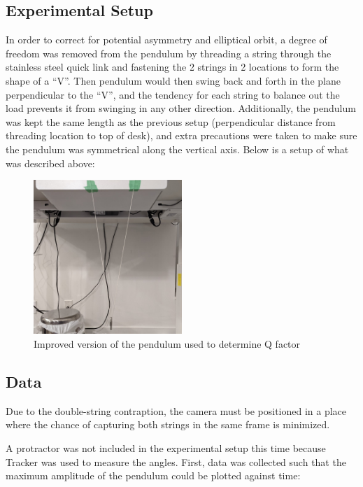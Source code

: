 \documentclass[12pt]{article}
\begin{document}
\subsection{Experimental Setup}
In order to correct for potential asymmetry and elliptical orbit, a degree of freedom was removed from the pendulum by threading a string through the stainless steel quick link and fastening the 2 strings in 2 locations to form the shape of a ``V''. Then pendulum would then swing back and forth in the plane perpendicular to the ``V'', and the tendency for each string to balance out the load prevents it from swinging in any other direction. Additionally, the pendulum was kept the same length as the previous setup (perpendicular distance from threading location to top of desk), and extra precautions were taken to make sure the pendulum was symmetrical along the vertical axis. Below is a setup of what was described above:
\begin{figure}[!hptb]
    \centering
    \includegraphics[width=0.5\textwidth]{../figures/exp_setup2.jpg}
    \caption{\centering Improved version of the pendulum used to determine Q factor}
    \label{fig:figure 3}
\end{figure}

\newpage

\subsection{Data}
Due to the double-string contraption, the camera must be positioned in a place where the chance of capturing both strings in the same frame is minimized.

A protractor was not included in the experimental setup this time because Tracker \cite{tracker} was used to measure the angles. First, data was collected such that the maximum amplitude of the pendulum could be plotted against time:
\end{document}
